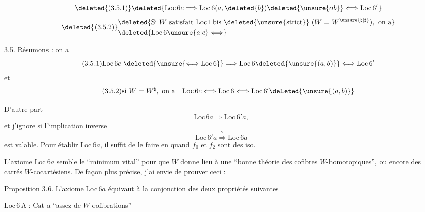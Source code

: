 
\[\tag*{\deleted{(3.5.1)}}\deleted{\mathrm{Loc}\,6c\Longrightarrow\mathrm{Loc}\,6(a,\deleted{b})\deleted{\unsure{ab}}\Longleftrightarrow\mathrm{Loc}\,6'}\]
\[\tag*{\deleted{(3.5.2)}}\begin{aligned}&\deleted{\text{Si } W\text{ satisfait } \mathrm{Loc}\,1\,\mathrm{bis}\ \deleted{\unsure{\text{strict}}}\ (W=W^{\unsure{\natural|\sharp}}),\ \text{on a}}\\&\deleted{\mathrm{Loc}\,6\unsure{a|c}\Longleftrightarrow}\end{aligned}\]

3.5. Résumons : on a
\[\tag*{(3.5.1)}\mathrm{Loc}\,6c\ \deleted{\unsure{\Longleftrightarrow\mathrm{Loc}\,6}}\Longrightarrow\mathrm{Loc}\,6\deleted{\unsure{(a,b)}}\Longleftrightarrow\mathrm{Loc}\,6'\]
et
\[\tag*{(3.5.2)}\text{si }W=W^{\natural},\ \text{on a}\quad\mathrm{Loc}\,6c\Longleftrightarrow\mathrm{Loc}\,6\Longleftrightarrow\mathrm{Loc}\,6'\deleted{\unsure{(a,b)}}\]


D'autre part
\[\tag*{(3.5.3)}\mathrm{Loc}\,6a\Longrightarrow\mathrm{Loc}\,6'a,\]
et j'ignore si  l'implication inverse
\[\mathrm{Loc}\,6'a\overset{?}{\Longrightarrow}\mathrm{Loc}\,6a\]
est valable. Pour établir $\mathrm{Loc}\,6a$, il suffit de le faire en  quand $f_0$ et $f_2$ sont des iso.

L'axiome $\mathrm{Loc}\,6a$ semble le ``minimum vital'' pour que $W$ donne lieu à une ``bonne théorie des cofibres $W$-homotopiques'', ou encore des carrés $W$-cocartésiens. De façon plus précise, j'ai envie de prouver ceci :

\uline{Proposition} 3.6. L'axiome $\mathrm{Loc}\,6a$ équivaut à la conjonction des deux propriétés suivantes

$\mathrm{Loc}\,6\,\mathrm{A}$ :  $\mathrm{Cat}$ a ``assez de $W$-cofibrations''
